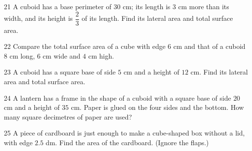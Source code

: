 \gap
\begin{probbox}{21}{\relax}
A cuboid has a base perimeter of $30$ cm; its length is $3$ cm more than its width, and its height is $\dfrac23$ of its length. Find its lateral area and total surface area.
\end{probbox}
\gap
\begin{probbox}{22}{\relax}
Compare the total surface area of a cube with edge $6$ cm and that of a cuboid $8$ cm long, $6$ cm wide and $4$ cm high.
\end{probbox}
\gap
\begin{probbox}{23}{\relax}
A cuboid has a square base of side $5$ cm and a height of $12$ cm. Find its lateral area and total surface area.
\end{probbox}
\gap
\begin{probbox}{24}{\relax}
A lantern has a frame in the shape of a cuboid with a square base of side $20$ cm and a height of $35$ cm. Paper is glued on the four sides and the bottom. How many square decimetres of paper are used?
\end{probbox}
\gap
\begin{probbox}{25}{\relax}
A piece of cardboard is just enough to make a cube-shaped box without a lid, with edge $2.5$ dm. Find the area of the cardboard. (Ignore the flaps.)
\end{probbox}

